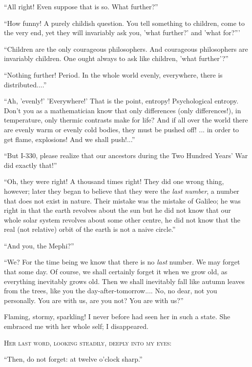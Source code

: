\documentclass[11pt,openany]{book}
\begin{document}
``All right! Even suppose that is so. What further?''

``How funny! A purely childish question. You tell something to children, come to the very end, yet they will invariably ask you, 'what further?' and 'what for?'''

``Children are the only courageous philosophers. And courageous philosophers are invariably children. One ought always to ask like children, 'what further'?''

``Nothing further! Period. In the whole world evenly, everywhere, there is distributed....''

``Ah, 'evenly!' 'Everywhere!' That is the point, entropy! Psychological entropy. Don't you as a mathematician know that only differences (only differences!), in temperature, only thermic contrasts make for life? And if all over the world there are evenly warm or evenly cold bodies, they must be pushed off! ... in order to get flame, explosions! And we shall push!...''

``But I-330, please realize that our ancestors during the Two Hundred Years' War did exactly that!''

``Oh, they were right! A thousand times right! They did one wrong thing, however; later they began to believe that they were the \emph{last number}, a number that does not exist in nature. Their mistake was the mistake of Galileo; he was right in that the earth revolves about the sun but he did not know that our whole solar system revolves about some other centre, he did not know that the real (not relative) orbit of the earth is not a naive circle.''

``And you, the Mephi?''

``We? For the time being we know that there is no \emph{last} number. We may forget that some day. Of course, we shall certainly forget it when we grow old, as everything inevitably grows old. Then we shall inevitably fall like autumn leaves from the trees, like you the day-after-tomorrow.... No, no dear, not you personally. You are with us, are you not? You are with us?''

Flaming, stormy, sparkling! I never before had seen her in such a state. She embraced me with her whole self; I disappeared.

\begin{center}\textsc{Her last word, looking steadily, deeply into my eyes:}\end{center}

``Then, do not forget: at twelve o'clock sharp.''
\end{document}
